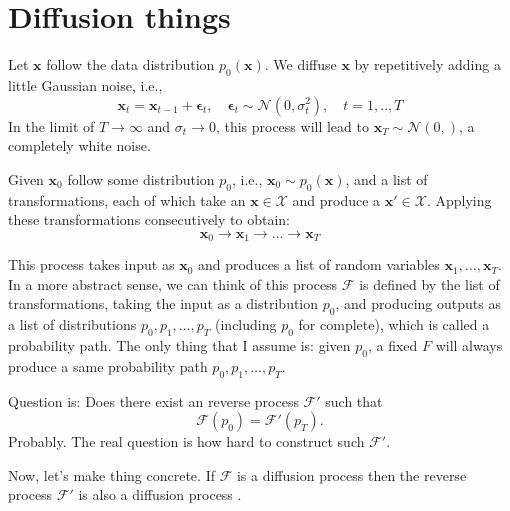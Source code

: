 \documentclass[11pt,a4paper]{article}
\begin{document}
\section{Diffusion things}%
\label{sec:diffusion_things}
Let $\bm{x}$ follow the data distribution $p_0(\bm{x})$. We diffuse $\bm{x}$ by repetitively adding a little Gaussian noise, i.e.,
\[
\bm{x}_t = \bm{x}_{t-1} + \boldsymbol \epsilon_t, \quad \boldsymbol \epsilon_t \sim \mathcal{N}(0, \sigma_t^2), \quad t=1, .., T
\] 
In the limit of $T \to \infty$ and $\sigma_t \to 0$, this process will lead to $\bm{x}_T \sim \mathcal{N}(0, )$, a completely white noise.

Given $\bm{x}_0$ follow some distribution $p_0$, i.e., $\bm{x}_0 \sim p_0(\bm{x})$, and a list of transformations, each of which take an $\bm{x} \in \mathcal{X}$ and produce a $\bm{x}' \in \mathcal{X}$. Applying these transformations consecutively to obtain:
\[
\bm{x}_0 \rightarrow \bm{x}_1 \rightarrow \ldots  \rightarrow \bm{x}_T
\] 

This process takes input as $\bm{x}_0$ and produces a list of random variables $\bm{x}_1, \ldots , \bm{x}_T$. In a more abstract sense, we can think of this process $\mathcal{F}$ is defined by the list of transformations, taking the input as a distribution $p_0$, and producing outputs as a list of distributions $p_0, p_1, \ldots , p_T$ (including $p_0$ for complete), which is called a probability path.
The only thing that I assume is: given $p_0$, a fixed $F$ will always produce a same probability path $p_0, p_1, \ldots , p_T$.

Question is: Does there exist an reverse process $\mathcal{F}'$ such that 
\[
\mathcal{F}(p_0) = \mathcal{F}'(p_T).
\] 
Probably. The real question is how hard to construct such $\mathcal{F}'$.

Now, let's make thing concrete. If $\mathcal{F}$ is a diffusion process then the reverse process $\mathcal{F}'$ is also a diffusion process \cite{anderson1982reverse}. 


\printbibliography
\end{document}
